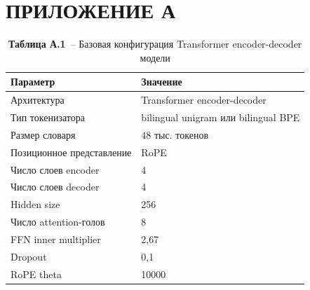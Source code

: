 \clearpage
{}
\section*{ПРИЛОЖЕНИЕ А}
\renewcommand{\thelstlisting}{А.\arabic{lstlisting}}
\setcounter{lstlisting}{0}

\begin{table}[H]
	\centering
	\caption*{\textbf{Таблица А.1}~-- Базовая конфигурация Transformer encoder-decoder модели}
	\begin{tabularx}{\textwidth}{|p{}|X|}
		\hline
		\textbf{Параметр} & \textbf{Значение} \\
		\hline
		Архитектура & Transformer encoder-decoder \\
		\hline
		Тип токенизатора & bilingual unigram или bilingual BPE \\
		\hline
		Размер словаря & 48 тыс. токенов \\
		\hline
		Позиционное представление & RoPE \\
		\hline
		Число слоев encoder & 4 \\
		\hline
		Число слоев decoder & 4 \\
		\hline
		Hidden size & 256 \\
		\hline
		Число attention-голов & 8 \\
		\hline
		FFN inner multiplier & 2{,}67 \\
		\hline
		Dropout & 0{,}1 \\
		\hline
		RoPE theta & 10000 \\
		\hline
	\end{tabularx}
\end{table}

